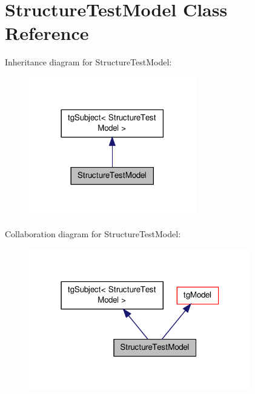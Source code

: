 \hypertarget{class_structure_test_model}{\section{Structure\-Test\-Model Class Reference}
\label{class_structure_test_model}
}


Inheritance diagram for Structure\-Test\-Model\-:\nopagebreak
\begin{figure}[H]
\begin{center}
\leavevmode
\includegraphics[width=206pt]{class_structure_test_model__inherit__graph}
\end{center}
\end{figure}


Collaboration diagram for Structure\-Test\-Model\-:\nopagebreak
\begin{figure}[H]
\begin{center}
\leavevmode
\includegraphics[width=274pt]{class_structure_test_model__coll__graph}
\end{center}
\end{figure}
